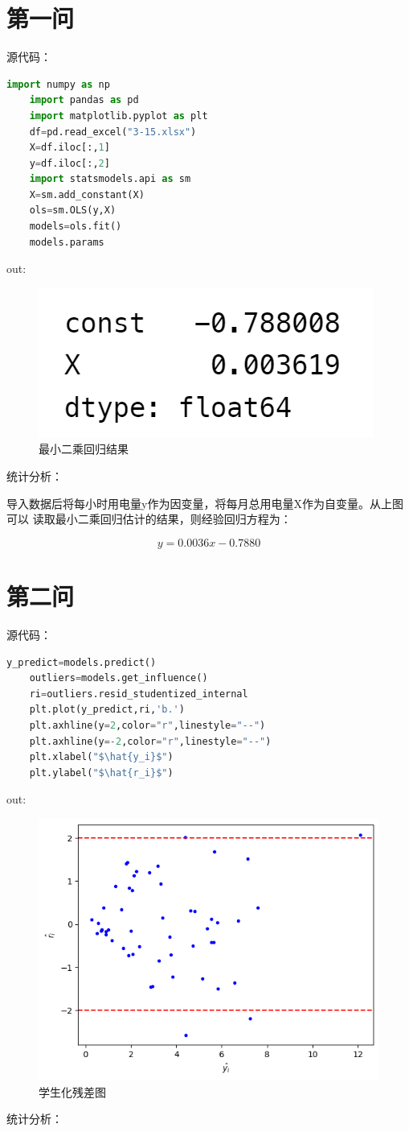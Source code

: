 \documentclass[a4paper,12pt]{article}
\begin{document}
\section{第一问}
源代码：
\begin{lstlisting}[language=python,breaklines]
	import numpy as np
	import pandas as pd
	import matplotlib.pyplot as plt
	df=pd.read_excel("3-15.xlsx")
	X=df.iloc[:,1]
	y=df.iloc[:,2]
	import statsmodels.api as sm
	X=sm.add_constant(X)
	ols=sm.OLS(y,X)
	models=ols.fit()
	models.params
\end{lstlisting}
out: 
\begin{figure}[htbp]
	\centering
	\includegraphics[scale=0.4]{out1.png}
	\caption{最小二乘回归结果}
\end{figure}
统计分析：

导入数据后将每小时用电量y作为因变量，将每月总用电量X作为自变量。从上图可以
读取最小二乘回归估计的结果，则经验回归方程为：

$$y=0.0036x-0.7880$$

\section{第二问}

源代码：
\begin{lstlisting}[language=python,breaklines]
	y_predict=models.predict()
	outliers=models.get_influence()
	ri=outliers.resid_studentized_internal
	plt.plot(y_predict,ri,'b.')
	plt.axhline(y=2,color="r",linestyle="--")
	plt.axhline(y=-2,color="r",linestyle="--")
	plt.xlabel("$\hat{y_i}$")
	plt.ylabel("$\hat{r_i}$")
\end{lstlisting}
out: 
\begin{figure}[htbp]
	\centering
	\includegraphics[scale=0.4]{out2.png}
	\caption{学生化残差图}
\end{figure}
统计分析：
\end{document}
